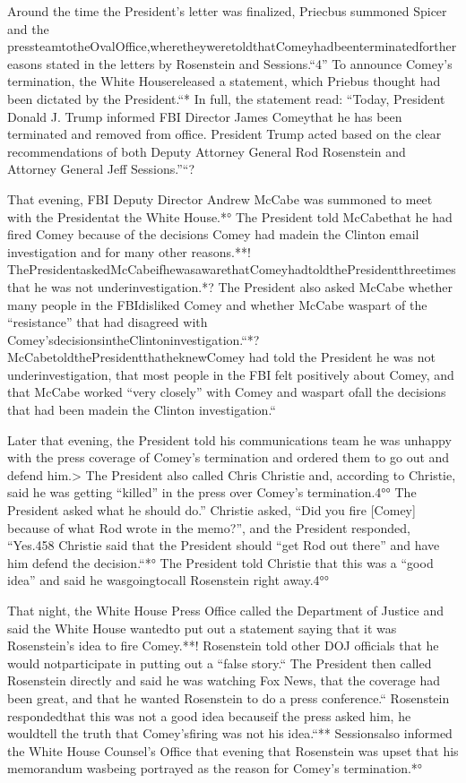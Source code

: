 {Around the time the President’s letter was finalized, Priecbus summoned Spicer and the pressteamtotheOvalOffice,wheretheyweretoldthatComeyhadbeenterminatedforthereasons stated in the letters by Rosenstein and Sessions.“4”
To announce Comey’s termination, the White Housereleased a statement, which Priebus thought had been dictated by the President.“*
In full, the statement read: “Today, President Donald J. Trump informed FBI Director James Comeythat he has been terminated and removed from office.
President Trump acted based on the clear recommendations of both Deputy Attorney General Rod Rosenstein and Attorney General Jeff Sessions.”“?

That evening, FBI Deputy Director Andrew McCabe was summoned to meet with the Presidentat the White House.*°
The President told McCabethat he had fired Comey because of the decisions Comey had madein the Clinton email investigation and for many other reasons.**!
ThePresidentaskedMcCabeifhewasawarethatComeyhadtoldthePresidentthreetimesthat he was not underinvestigation.*?
The President also asked McCabe whether many people in the FBIdisliked Comey and whether McCabe waspart of the “resistance” that had disagreed with Comey’sdecisionsintheClintoninvestigation.“*?
McCabetoldthePresidentthatheknewComey had told the President he was not underinvestigation, that most people in the FBI felt positively about Comey, and that McCabe worked “very closely” with Comey and waspart ofall the decisions that had been madein the Clinton investigation.“

Later that evening, the President told his communications team he was unhappy with the press coverage of Comey’s termination and ordered them to go out and defend him.>
The President also called Chris Christie and, according to Christie, said he was getting “killed” in the press over Comey’s termination.4°°
The President asked what he should do.”
Christie asked, “Did you fire [Comey] because of what Rod wrote in the memo?”, and the President responded, “Yes.458
Christie said that the President should “get Rod out there” and have him defend the decision.“*°
The President told Christie that this was a “good idea” and said he wasgoingtocall Rosenstein right away.4°°

That night, the White House Press Office called the Department of Justice and said the White House wantedto put out a statement saying that it was Rosenstein’s idea to fire Comey.**!
Rosenstein told other DOJ officials that he would notparticipate in putting out a “false story.“
The President then called Rosenstein directly and said he was watching Fox News, that the coverage had been great, and that he wanted Rosenstein to do a press conference.“
Rosenstein respondedthat this was not a good idea becauseif the press asked him, he wouldtell the truth that Comey’sfiring was not his idea.“**
Sessionsalso informed the White House Counsel’s Office that evening that Rosenstein was upset that his memorandum wasbeing portrayed as the reason for Comey’s termination.*°

}
